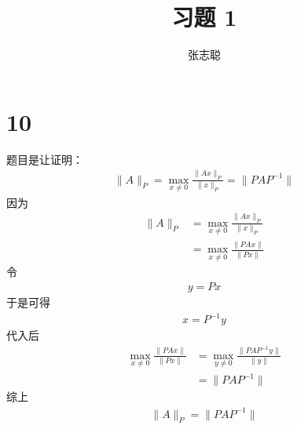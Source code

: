 \documentclass{article}
\begin{document}
\title{习题 1}
\author{张志聪}
\maketitle

\section*{10}

题目是让证明：
\begin{align*}
  \|A\|_P = \max\limits_{x \neq 0} \frac{\|Ax\|_P}{\|x\|_P} = \|P A P^{-1}\|
\end{align*}
因为
\begin{align*}
  \|A\|_P 
  & = \max\limits_{x \neq 0} \frac{\|Ax\|_P}{\|x\|_P} \\
  & = \max\limits_{x \neq 0} \frac{\|PAx\|}{\|Px\|} 
\end{align*}
令
\begin{align*}
  y = Px
\end{align*}
于是可得
\begin{align*}
  x = P^{-1} y
\end{align*}
代入后
\begin{align*}
  \max\limits_{x \neq 0} \frac{\|PAx\|}{\|Px\|} 
  & = \max\limits_{y \neq 0} \frac{\|PAP^{-1}y\|}{\|y\|} \\
  & = \|PA P^{-1}\|
\end{align*}
综上
\begin{align*}
  \|A\|_P = \|P A P^{-1}\|
\end{align*}
\end{document}
